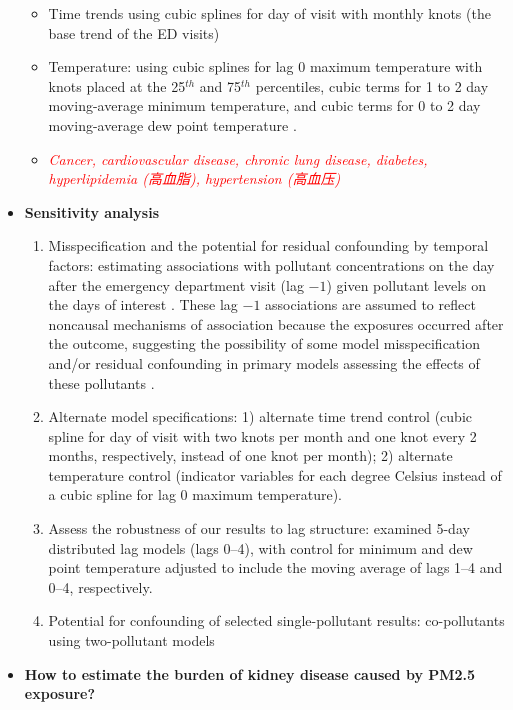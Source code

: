 \documentclass{article}
\begin{document}
\begin{itemize}
{\begin{itemize}
            \item Time trends using cubic splines for day of visit with monthly knots (the base trend of the ED visits)
            \item Temperature: using cubic splines for lag 0 maximum temperature with knots placed at the 25$^{th}$ and 75$^{th}$ percentiles, cubic terms for 1 to 2 day moving-average minimum temperature, and cubic terms for 0 to 2 day moving-average dew point temperature \citep{strickland2010short}.
            \item \textit{\textcolor{red}{Cancer, cardiovascular disease, chronic lung disease, diabetes, hyperlipidemia (高血脂), hypertension (高血压)}}
        \end{itemize}
    }
    \item \textbf{Sensitivity analysis} {
        \begin{enumerate}
            \item Misspecification and the potential for residual confounding by temporal factors: estimating associations with pollutant concentrations on the day after the emergency department visit (lag $-1$) given pollutant levels on the days of interest \citep{flanders2011method}. These lag $-1$ associations are assumed to reflect noncausal mechanisms of association because the exposures occurred after the outcome, suggesting the possibility of some model misspecification and/or residual confounding in primary models assessing the effects of these pollutants \citep{flanders2011method}.
            \item Alternate model specifications: 1) alternate time trend control (cubic spline for day of visit with two knots per month and one knot every 2 months, respectively, instead of one knot per month); 2) alternate temperature control (indicator variables for each degree Celsius instead of a cubic spline for lag 0 maximum temperature).
            \item Assess the robustness of our results to lag structure: examined 5-day distributed lag models (lags 0--4), with control for minimum and dew point temperature adjusted to include the moving average of lags 1--4 and 0--4, respectively.
            \item Potential for confounding of selected single-pollutant results: co-pollutants using two-pollutant models
        \end{enumerate}
    }
    \item \textbf{How to estimate the burden of kidney disease caused by PM2.5 exposure?} {
        \begin{itemize}

\end{itemize}}
\end{itemize}
\end{document}
